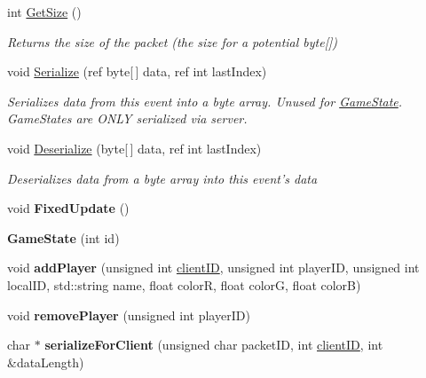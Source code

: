 \begin{DoxyCompactItemize}
\item 
int \hyperlink{class_game_state_a57d152b243c11aa86e7ba0f07b4bd0dd}{Get\-Size} ()
\begin{DoxyCompactList}\small\item\em Returns the size of the packet (the size for a potential byte\mbox{[}\mbox{]}) \end{DoxyCompactList}\item 
void \hyperlink{class_game_state_af57a06c77a763e8b57841bab79c9b12f}{Serialize} (ref byte\mbox{[}$\,$\mbox{]} data, ref int last\-Index)
\begin{DoxyCompactList}\small\item\em Serializes data from this event into a byte array. Unused for \hyperlink{class_game_state}{Game\-State}. Game\-States are O\-N\-L\-Y serialized via server. \end{DoxyCompactList}\item 
void \hyperlink{class_game_state_aa5f956de2c49182fbe5fc32e9d2ca431}{Deserialize} (byte\mbox{[}$\,$\mbox{]} data, ref int last\-Index)
\begin{DoxyCompactList}\small\item\em Deserializes data from a byte array into this event's data \end{DoxyCompactList}\item 
\hypertarget{class_game_state_a268b639f06e4fa7fa1ca1819cc5d3175}{void {\bfseries Fixed\-Update} ()}\label{class_game_state_a268b639f06e4fa7fa1ca1819cc5d3175}

\item 
\hypertarget{class_game_state_a74a35fb7045c0eee7e68f07c387e2ddf}{{\bfseries Game\-State} (int id)}\label{class_game_state_a74a35fb7045c0eee7e68f07c387e2ddf}

\item 
\hypertarget{class_game_state_ad74bf5767b052d5b32805220ca0c1fab}{void {\bfseries add\-Player} (unsigned int \hyperlink{class_game_state_ad24a423ba6655fc6541b2f12ce98e0d0}{client\-I\-D}, unsigned int player\-I\-D, unsigned int local\-I\-D, std\-::string name, float color\-R, float color\-G, float color\-B)}\label{class_game_state_ad74bf5767b052d5b32805220ca0c1fab}

\item 
\hypertarget{class_game_state_a733fa68895adba783b0b4b804f16906f}{void {\bfseries remove\-Player} (unsigned int player\-I\-D)}\label{class_game_state_a733fa68895adba783b0b4b804f16906f}

\item 
\hypertarget{class_game_state_a291fcda337b1a25c21871fe338399c27}{char $\ast$ {\bfseries serialize\-For\-Client} (unsigned char packet\-I\-D, int \hyperlink{class_game_state_ad24a423ba6655fc6541b2f12ce98e0d0}{client\-I\-D}, int \&data\-Length)}\label{class_game_state_a291fcda337b1a25c21871fe338399c27}

\end{DoxyCompactItemize}
